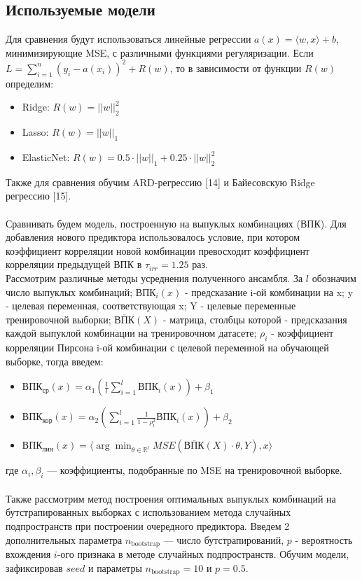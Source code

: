 \documentclass{article}
\begin{document}
\subsection{Используемые модели}
Для сравнения будут использоваться линейные регрессии $a(x) = \langle w, x \rangle + b$, минимизирующие MSE, с различными функциями регуляризации. Если $L = \sum_{i=1}^n (y_i - a(x_i))^2 + R(w)$, то в зависимости от функции $R(w)$ определим:
\begin{itemize}
    \item Ridge: $R(w) = ||w||_2^2$
    \item Lasso: $R(w) = ||w||_1$
    \item ElasticNet: $R(w) = 0.5 \cdot ||w||_1 + 0.25 \cdot ||w||_2^2$
\end{itemize}
Также для сравнения обучим ARD-регрессию [14] и Байесовскую Ridge регрессию [15]. \\ \\
Сравнивать будем модель, построенную на выпуклых комбинациях (ВПК). Для добавления нового предиктора использовалось условие, при котором коэффициент корреляции новой комбинации превосходит коэффициент корреляции предыдущей ВПК в $\tau_{irr} = 1.25$ раз.
\\
Рассмотрим различные методы усреднения полученного ансамбля. За $l$ обозначим число выпуклых комбинаций; $\text{ВПК}_i(x)$ - предсказание i-ой комбинации на x; y - целевая переменная, соответствующая x; Y - целевые переменные тренировочной выборки; $\overline{\text{ВПК}}(X)$ - матрица, столбцы которой - предсказания каждой выпуклой комбинации на тренировочном датасете; $\rho_i$ - коэффициент корреляции Пирсона i-ой комбинации с целевой переменной на обучающей выборке, тогда введем:
\begin{itemize}
    \item $\text{ВПК}_{\text{ср}}(x) = \alpha_1 (\frac{1}{l} \sum_{i=1}^l \text{ВПК}_i(x)) + \beta_1$
    \item $\text{ВПК}_{\text{кор}}(x) = \alpha_2 ( \sum_{i=1}^l \frac{1}{1 - \rho^2_i} \text{ВПК}_i(x)) + \beta_2$
    \item $\text{ВПК}_{\text{лин}}(x) = \langle \arg \min_{\theta \in \mathbb{R}^l} MSE(\overline{\text{ВПК}}(X) \cdot \theta, Y), x \rangle$
\end{itemize}
где $\alpha_i, \beta_i$ — коэффициенты, подобранные по MSE на тренировочной выборке.
\\ \\
Также рассмотрим метод построения оптимальных выпуклых комбинаций на бутстрапированных выборках с использованием метода случайных подпространств при построении очередного предиктора. Введем 2 дополнительных параметра $n_{\text{bootstrap}}$ — число бутстрапирований, $p$ - вероятность вхождения $i$-ого признака в методе случайных подпространств. Обучим модели, зафиксировав $seed$ и параметры $n_{\text{bootstrap}} = 10$ и $p=0.5$.
\newpage
\end{document}
